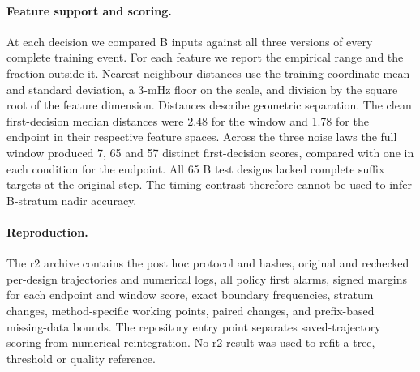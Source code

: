 \documentclass[10pt]{article}
\begin{document}
\paragraph{Feature support and scoring.}
At each decision we compared B inputs against all three versions of every complete training event. For each feature we report the empirical range and the fraction outside it. Nearest-neighbour distances use the training-coordinate mean and standard deviation, a 3-mHz floor on the scale, and division by the square root of the feature dimension. Distances describe geometric separation. The clean first-decision median distances were 2.48 for the window and 1.78 for the endpoint in their respective feature spaces. Across the three noise laws the full window produced 7, 65 and 57 distinct first-decision scores, compared with one in each condition for the endpoint. All 65 B test designs lacked complete suffix targets at the original step. The timing contrast therefore cannot be used to infer B-stratum nadir accuracy.

\paragraph{Reproduction.}
The r2 archive contains the post hoc protocol and hashes, original and rechecked per-design trajectories and numerical logs, all policy first alarms, signed margins for each endpoint and window score, exact boundary frequencies, stratum changes, method-specific working points, paired changes, and prefix-based missing-data bounds. The repository entry point separates saved-trajectory scoring from numerical reintegration. No r2 result was used to refit a tree, threshold or quality reference.
\end{document}

